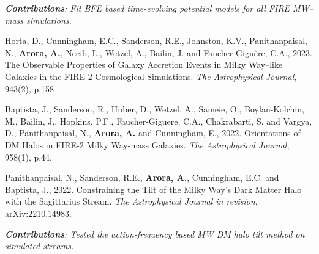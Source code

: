 \documentclass[UTF8]{article}
\begin{document}
\begin{etaremune}
\textit{\textbf{Contributions}: Fit BFE based time-evolving potential models for all FIRE MW--mass simulations.}

\item Horta, D., Cunningham, E.C., Sanderson, R.E., Johnston, K.V., Panithanpaisal, N., \textbf{Arora, A.}, Necib, L., Wetzel, A., Bailin, J. and Faucher-Giguère, C.A., 2023. The Observable Properties of Galaxy Accretion Events in Milky Way–like Galaxies in the FIRE-2 Cosmological Simulations. \textit{The Astrophysical Journal}, 943(2), p.158

\item Baptista, J., Sanderson, R., Huber, D., Wetzel, A., Sameie, O., Boylan-Kolchin, M., Bailin, J., Hopkins, P.F., Faucher-Giguere, C.A., Chakrabarti, S. and Vargya, D., Panithanpaisal, N., \textbf{Arora, A.} and Cunningham, E., 2022. Orientations of DM Halos in FIRE-2 Milky Way-mass Galaxies. \textit{The Astrophysical Journal}, 958(1), p.44.

\item Panithanpaisal, N., Sanderson, R.E., \textbf{Arora, A.}, Cunningham, E.C. and Baptista, J., 2022. Constraining the Tilt of the Milky Way's Dark Matter Halo with the Sagittarius Stream. \textit{The Astrophysical Journal in revision},  arXiv:2210.14983.

\textit{\textbf{Contributions}: Tested the action-frequency based MW DM halo tilt method on simulated streams.}

\end{etaremune}
\end{document}
